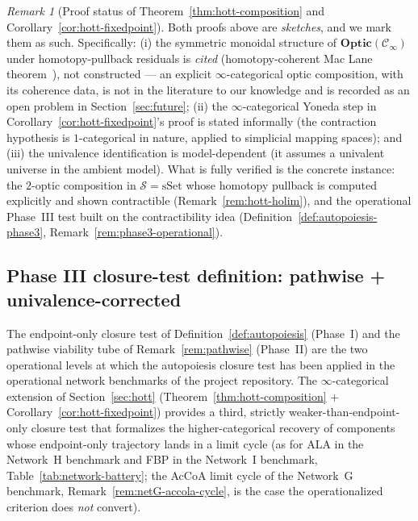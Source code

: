 \documentclass[11pt,a4paper]{article}
\theoremstyle{plain}
\theoremstyle{definition}
\theoremstyle{remark}
\newtheorem{remark}[theorem]{Remark}
\newcommand{\Optic}{\mathbf{Optic}}
\begin{document}
\begin{remark}[Proof status of Theorem~\ref{thm:hott-composition} and
Corollary~\ref{cor:hott-fixedpoint}]
\label{rem:proof-status-hott}
Both proofs above are \emph{sketches}, and we mark them as such.
Specifically: (i) the symmetric monoidal structure of
$\Optic(\mathcal{C}_\infty)$ under homotopy-pullback residuals is
\emph{cited} (homotopy-coherent Mac Lane
theorem~\cite[Thm.~2.4.3]{lurie2017ha}), not constructed
--- an explicit $\infty$-categorical optic composition, with its
coherence data, is not in the literature to our knowledge and is
recorded as an open problem in Section~\ref{sec:future};
(ii) the $\infty$-categorical Yoneda step in
Corollary~\ref{cor:hott-fixedpoint}'s proof is stated informally
(the contraction hypothesis is $1$-categorical in nature, applied to
simplicial mapping spaces); and (iii) the univalence identification
is model-dependent (it assumes a univalent universe in the ambient
model). What is fully verified is the concrete instance: the
$2$-optic composition in $\mathcal{S}=\mathrm{sSet}$ whose homotopy
pullback is computed explicitly and shown contractible
(Remark~\ref{rem:hott-holim}), and the operational Phase~III test
built on the contractibility idea
(Definition~\ref{def:autopoiesis-phase3},
Remark~\ref{rem:phase3-operational}).
\end{remark}

\subsection{Phase III closure-test definition: pathwise + univalence-corrected}
\label{sec:phase3}

The endpoint-only closure test of Definition~\ref{def:autopoiesis} (Phase~I)
and the pathwise viability tube of Remark~\ref{rem:pathwise} (Phase~II) are
the two operational levels at which the autopoiesis closure test has been
applied in the operational network benchmarks of the project repository.
The $\infty$-categorical extension of Section~\ref{sec:hott} (Theorem~\ref{thm:hott-composition}
+ Corollary~\ref{cor:hott-fixedpoint}) provides a third, strictly
weaker-than-endpoint-only closure test that formalizes the higher-categorical
recovery of components whose endpoint-only trajectory lands in a limit
cycle (as for ALA in the Network~H benchmark and FBP in the
Network~I benchmark, Table~\ref{tab:network-battery}; the AcCoA
limit cycle of the Network~G benchmark,
Remark~\ref{rem:netG-accola-cycle}, is the case the operationalized
criterion does \emph{not} convert).
\end{document}
